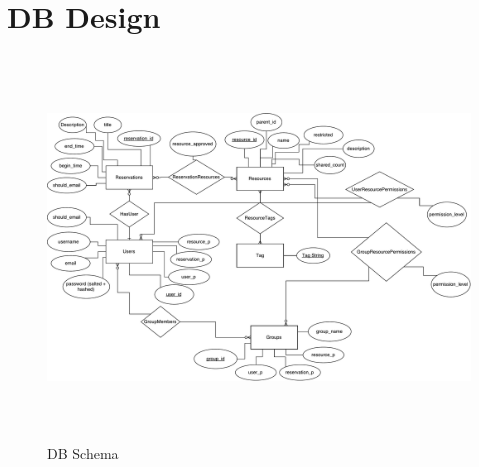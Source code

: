 \documentclass[12pt]{article}
\begin{document}
\section{DB Design}
\label{appendix:DBDesign}
\begin{figure}[h]
\begin{center}
\includegraphics[height=4in]{Evolution4DB.pdf}
\end{center}
\caption{DB Schema}
\end{figure}
\end{document}
